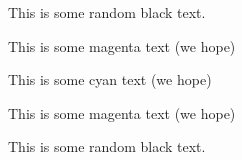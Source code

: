 \documentclass{article}
\makeatletter
\def\current@color{rgb 0. 0. 0.}
\def\current@color{rgb 0. 0. 0.}
\makeatother
\begin{document}


\def\current@color{rgb 0 0 0}

This is some random black text.
{\color[rgb]{1,0,1}
This is some magenta text (we hope)

{\color[rgb]{0,1,1}
This is some cyan text (we hope)

}
This is some magenta text (we hope)

}
This is some random black text.
\end{document}
